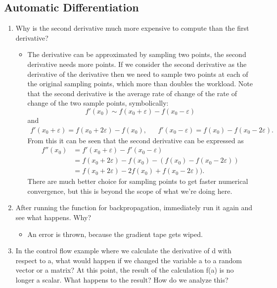 \documentclass{article}
\begin{document}
\subsection{Automatic Differentiation}
\begin{enumerate}
\item Why is the second derivative much more expensive to compute than the first derivative?
	\begin{itemize}
		\item The derivative can be approximated by sampling two points, the second derivative needs more points. If we consider the second derivative as the derivative of the derivative then we need to sample two points at each of the original sampling points, which more than doubles the workload. Note that the second derivative is the average rate of change of the rate of change of the two sample points, symbolically:
		$$
		f'(x_0) \sim f(x_0 + \varepsilon) - f(x_0 - \varepsilon)
		$$
		and
		\begin{align*}
		f'(x_0 + \varepsilon) = f(x_0 + 2\varepsilon) - f(x_0),&&f'(x_0 - \varepsilon) = f(x_0) - f(x_0 - 2\varepsilon).
		\end{align*}
		From this it can be seen that the second derivative can be expressed as
		\begin{align*}
		f''(x_0) &= f'(x_0 + \varepsilon) - f'(x_0 - \varepsilon) \\
		&= f(x_0 + 2\varepsilon) - f(x_0) - (f(x_0) - f(x_0 - 2\varepsilon)) \\
		&= f(x_0 + 2\varepsilon) - 2f(x_0) + f(x_0 - 2\varepsilon)).
		\end{align*}
		There are much better choice for sampling points to get faster numerical convergence, but this is beyond the scope of what we're doing here. 
	\end{itemize}
\item After running the function for backpropagation, immediately run it again and see what happens. Why?
	\begin{itemize}
		\item An error is thrown, because the gradient tape gets wiped.
	\end{itemize}
\item In the control flow example where we calculate the derivative of d with respect to a, what would happen if we changed the variable a to a random vector or a matrix? At this point, the result of the calculation f(a) is no longer a scalar. What happens to the result? How do we analyze this?
	\begin{itemize}

\end{itemize}
\end{enumerate}
\end{document}

